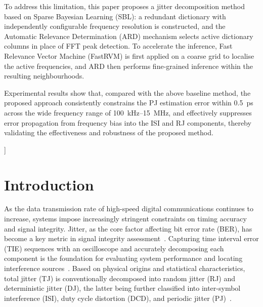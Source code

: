 \documentclass[10pt, a4paper, twocolumn]{article}
\begin{document}
{    To address this limitation, this paper proposes a jitter decomposition method based on Sparse Bayesian Learning (SBL): a redundant dictionary with independently configurable frequency resolution is constructed, and the Automatic Relevance Determination (ARD) mechanism selects active dictionary columns in place of FFT peak detection. To accelerate the inference, Fast Relevance Vector Machine (FastRVM) is first applied on a coarse grid to localise the active frequencies, and ARD then performs fine-grained inference within the resulting neighbourhoods.

    Experimental results show that, compared with the above baseline method, the proposed approach consistently constrains the PJ estimation error within 0.5~ps across the wide frequency range of 100~kHz--15~MHz, and effectively suppresses error propagation from frequency bias into the ISI and RJ components, thereby validating the effectiveness and robustness of the proposed method.


    \vspace{2.5em}
}]


\section{Introduction}

As the data transmission rate of high-speed digital communications continues to increase, systems impose increasingly stringent constraints on timing accuracy and signal integrity. Jitter, as the core factor affecting bit error rate (BER), has become a key metric in signal integrity assessment~\cite{balestrieri_review_2019}. Capturing time interval error (TIE) sequences with an oscilloscope and accurately decomposing each component is the foundation for evaluating system performance and locating interference sources~\cite{chen_methodology_2023}. Based on physical origins and statistical characteristics, total jitter (TJ) is conventionally decomposed into random jitter (RJ) and deterministic jitter (DJ), the latter being further classified into inter-symbol interference (ISI), duty cycle distortion (DCD), and periodic jitter (PJ)~\cite{tripathi_review_2018}.
\end{document}
